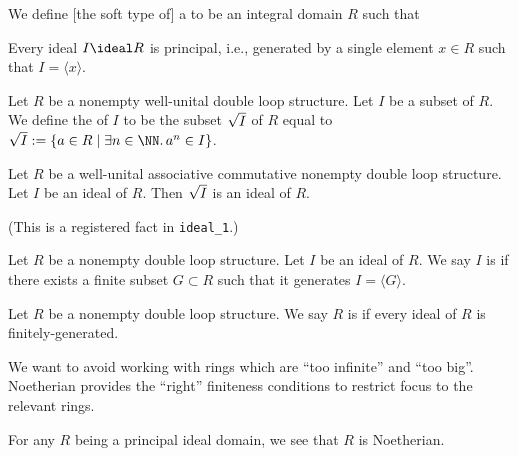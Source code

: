 \begin{definition}
We define [the soft type of] a  to be
an integral domain $R$ such that
\begin{itemize}
 Every ideal
$I\ideal R$ is principal, i.e., generated by a single element $x\in R$
such that $I=\langle x\rangle$.
\end{itemize}
\end{definition}

\begin{definition}
Let $R$ be a nonempty well-unital double loop structure.
Let $I$ be a subset of $R$.
We define the  of $I$ to be the subset $\sqrt{I}$
of $R$ equal to $\Radical{I}:=\{a\in R\mid\exists n\in\NN\ldotp a^{n}\in I\}$.
\end{definition}

\begin{theorem}
Let $R$ be a well-unital associative commutative nonempty double loop structure.
Let $I$ be an ideal of $R$.
Then $\sqrt{I}$ is an ideal of $R$.
\end{theorem}

(This is a registered fact in \texttt{ideal\_1}.)

\begin{definition}
Let $R$ be a nonempty double loop structure.
Let $I$ be an ideal of $R$.
We say $I$ is  if there exists a finite
subset $G\subset R$ such that it generates $I=\langle G\rangle$.
\end{definition}

\begin{definition}
Let $R$ be a nonempty double loop structure.
We say $R$ is  if every ideal of $R$ is finitely-generated.
\end{definition}

\begin{remark}
We want to avoid working with rings which are ``too infinite'' and
``too big''. Noetherian provides the ``right'' finiteness conditions
to restrict focus to the relevant rings.
\end{remark}

\begin{theorem}
For any $R$ being a principal ideal domain,
we see that $R$ is Noetherian.
\end{theorem}

